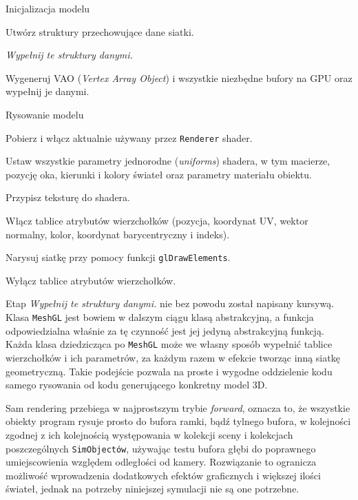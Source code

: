 		\begin{algorithm}
			\label{alg_4_4}
			\caption{Inicjalizacja modelu}	
			
			Utwórz struktury przechowujące dane siatki.
			
			\emph{Wypełnij te struktury danymi.}
			
			Wygeneruj VAO (\emph{Vertex Array Object}) i wszystkie niezbędne bufory na GPU oraz wypełnij je danymi.
		\end{algorithm}
		
		\begin{algorithm}
			\label{alg_4_5}
			\caption{Rysowanie modelu}	
			
			Pobierz i włącz aktualnie używany przez \texttt{Renderer} shader.
			
			Ustaw wszystkie parametry jednorodne (\emph{uniforms}) shadera, w tym macierze, pozycję oka, kierunki i kolory świateł oraz parametry materiału obiektu.
			
			Przypisz teksturę do shadera.
			
			Włącz tablice atrybutów wierzchołków (pozycja, koordynat UV, wektor normalny, kolor, koordynat barycentryczny i indeks).
			
			Narysuj siatkę przy pomocy funkcji \texttt{glDrawElements}.
			
			Wyłącz tablice atrybutów wierzchołków.
		\end{algorithm}
		
		Etap \emph{Wypełnij te struktury danymi.} nie bez powodu został napisany kursywą. Klasa \texttt{MeshGL} jest bowiem w dalszym ciągu klasą abstrakcyjną, a funkcja odpowiedzialna właśnie za tę czynność jest jej jedyną abstrakcyjną funkcją. Każda klasa dziedzicząca po \texttt{MeshGL} może we własny sposób wypełnić tablice wierzchołków i ich parametrów, za każdym razem w efekcie tworząc inną siatkę geometryczną. Takie podejście pozwala na proste i wygodne oddzielenie kodu samego rysowania od kodu generującego konkretny model 3D.
		
		Sam rendering przebiega w najprostszym trybie \emph{forward}, oznacza to, że wszystkie obiekty program rysuje prosto do bufora ramki, bądź tylnego bufora, w kolejności zgodnej z ich kolejnością występowania w kolekcji sceny i kolekcjach poszczególnych \texttt{SimObjectów}, używając testu bufora głębi do poprawnego umiejscowienia względem odległości od kamery. Rozwiązanie to ogranicza możliwość wprowadzenia dodatkowych efektów graficznych i większej ilości świateł, jednak na potrzeby niniejszej symulacji nie są one potrzebne.
		
